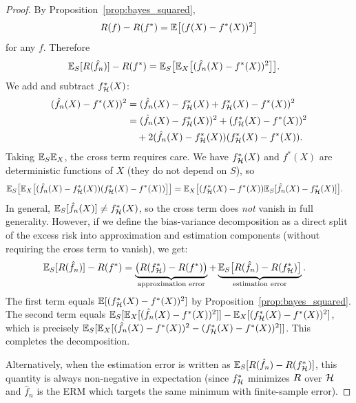 \documentclass[11pt,a4paper]{article}
\begin{document}
\begin{proof}
By Proposition~\ref{prop:bayes_squared},
\[
    R(f) - R(f^*) = \mathbb{E}\bigl[(f(X) - f^*(X))^2\bigr]
\]
for any $f$.  Therefore
\begin{align*}
    \mathbb{E}_S[R(\hat{f}_n)] - R(f^*)
    &= \mathbb{E}_S\bigl[\mathbb{E}_X\bigl[(\hat{f}_n(X) - f^*(X))^2\bigr]\bigr].
\end{align*}
We add and subtract $f_{\mathcal{H}}^*(X)$:
\begin{align*}
    (\hat{f}_n(X) - f^*(X))^2
    &= (\hat{f}_n(X) - f_{\mathcal{H}}^*(X)
    + f_{\mathcal{H}}^*(X) - f^*(X))^2 \\
    &= (\hat{f}_n(X) - f_{\mathcal{H}}^*(X))^2
    + (f_{\mathcal{H}}^*(X) - f^*(X))^2 \\
    &\quad + 2(\hat{f}_n(X) - f_{\mathcal{H}}^*(X))
    (f_{\mathcal{H}}^*(X) - f^*(X)).
\end{align*}
Taking $\mathbb{E}_S\mathbb{E}_X$, the cross term requires care.  We have
$f_{\mathcal{H}}^*(X)$ and $f^*(X)$ are deterministic functions of $X$
(they do not depend on $S$), so
\begin{align*}
    \mathbb{E}_S\bigl[\mathbb{E}_X\bigl[(\hat{f}_n(X) - f_{\mathcal{H}}^*(X))
    (f_{\mathcal{H}}^*(X) - f^*(X))\bigr]\bigr]
    &= \mathbb{E}_X\bigl[(f_{\mathcal{H}}^*(X) - f^*(X))
    \mathbb{E}_S[\hat{f}_n(X) - f_{\mathcal{H}}^*(X)]\bigr].
\end{align*}
In general, $\mathbb{E}_S[\hat{f}_n(X)] \neq f_{\mathcal{H}}^*(X)$, so the cross
term does \emph{not} vanish in full generality.  However, if we
define the bias-variance decomposition as a direct split of the
excess risk into approximation and estimation components (without
requiring the cross term to vanish), we get:
\begin{align*}
    \mathbb{E}_S[R(\hat{f}_n)] - R(f^*)
    &= \underbrace{\bigl(R(f_{\mathcal{H}}^*) - R(f^*)\bigr)}_{
    \text{approximation error}}
    + \underbrace{\mathbb{E}_S\bigl[R(\hat{f}_n)
    - R(f_{\mathcal{H}}^*)\bigr]}_{\text{estimation error}}.
\end{align*}
The first term equals $\mathbb{E}[(f_{\mathcal{H}}^*(X) - f^*(X))^2]$ by
Proposition~\ref{prop:bayes_squared}.  The second term equals
$\mathbb{E}_S[\mathbb{E}_X[(\hat{f}_n(X) - f^*(X))^2]]
- \mathbb{E}_X[(f_{\mathcal{H}}^*(X) - f^*(X))^2]$, which is precisely
$\mathbb{E}_S[\mathbb{E}_X[(\hat{f}_n(X) - f^*(X))^2
- (f_{\mathcal{H}}^*(X) - f^*(X))^2]]$.  This completes the
decomposition.

Alternatively, when the estimation error is written as
$\mathbb{E}_S[R(\hat{f}_n) - R(f_{\mathcal{H}}^*)]$, this quantity is
always non-negative in expectation (since $f_{\mathcal{H}}^*$ minimizes
$R$ over $\mathcal{H}$ and $\hat{f}_n$ is the ERM which targets
the same minimum with finite-sample error).
\end{proof}
\end{document}
